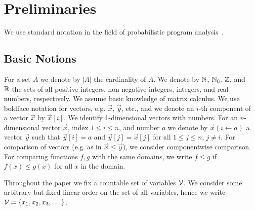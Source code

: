
\vspace{-1em}
\section{Preliminaries}\label{sec:prelim}

We use standard notation in the field of probabilistic program 
analysis~\cite{POPL17PAPER}.

\vspace{-1em}
\subsection{Basic Notions}
\vspace{-0.5em}
For a set $A$ we denote by $|A|$ the cardinality of $A$. We denote by $\mathbb{N}$,
$\mathbb{N}_0$, $\mathbb{Z}$, and $\mathbb{R}$ the sets of all positive integers, non-negative
integers, integers, and real numbers, respectively. We assume basic knowledge 
of matrix calculus.
We use boldface notation for
vectors, e.g. $\vec{x}$, $\vec{y}$, etc., and we denote an $i$-th component of a
vector $\vec{x}$ by $\vec{x}[i]$. 
We identify 1-dimensional vectors with numbers. For an 
$n$-dimensional vector 
$\vec{x}$, index $1 \leq i\leq n$, and number $a$ we denote by $\vec{x}(i\leftarrow a)$ 
a 
vector $\vec{y}$ such that $\vec{y}[i]=a$ and $\vec{y}[j]=\vec{x}[j]$ for all 
$1\leq j \leq n$, $j\neq i$.
For comparison of vectors (e.g. as in $\vec{x}\leq \vec{y}$), we consider componentwise 
comparison. 
For comparing functions $f,g$ with the same domains, we write $f\leq g$ 
if $f(x)\leq g(x)$ for all $x$ in the domain.


\smallskip{}
Throughout the paper we fix a countable set of variables $\mathcal{V}$. 
We consider some arbitrary but fixed linear order on the set of all variables, 
hence we write 
$\mathcal{V}=\{x_1,x_2,x_3,\dots\}$. 


